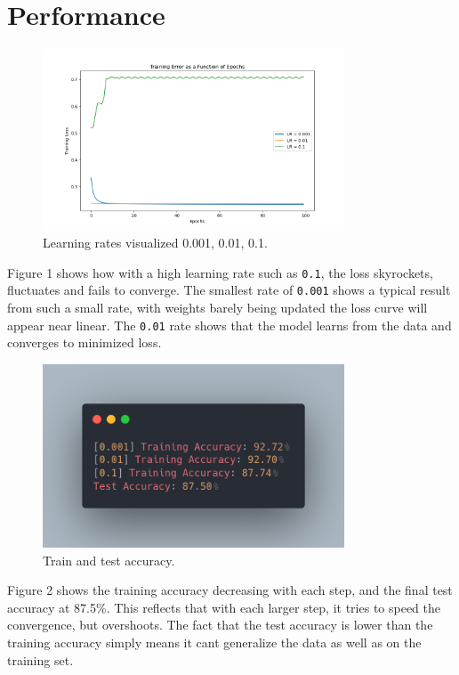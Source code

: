 \documentclass{article}
\begin{document}
\section{Performance}
\begin{figure}[H]
    \centering
    \includegraphics[width=0.8\textwidth]{../imgs/diff_lr.png} %
    \caption{Learning rates visualized 0.001, 0.01, 0.1.}
\end{figure}
Figure 1 shows how with a high learning rate such as \verb|0.1|, the loss
skyrockets, fluctuates and fails to converge. The smallest rate of
\verb|0.001| shows a typical result from such a small rate, with weights
barely being updated the loss curve will appear near linear. The \verb|0.01|
rate shows that the model learns from the data and converges to minimized loss.

\bigskip

\begin{figure}[H]
    \centering
    \includegraphics[width=0.8\textwidth]{../imgs/carbon1.png} %
    \caption{Train and test accuracy.}
\end{figure}
Figure 2 shows the training accuracy decreasing with each step, and the
final test accuracy at 87.5\%. This reflects that with each larger step,
it tries to speed the convergence, but overshoots. The fact that the
test accuracy is lower than the training accuracy simply means it cant
generalize the data as well as on the training set.
\end{document}
